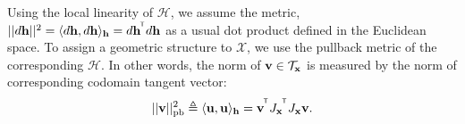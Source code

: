 Using the local linearity of $\mathcal{H}$, we assume the metric, $||d\mathbf{h}||^2 = \langle d\mathbf{h}, d\mathbf{h} \rangle_\mathbf{h} = d\mathbf{h}^{^{\mkern-1.5mu\mathsf{T}}} d\mathbf{h}$ as a usual dot product defined in the Euclidean space.
To assign a geometric structure to $\mathcal{X}$, we use the pullback metric of the corresponding $\mathcal{H}$.
In other words, the norm of $\mathbf{v} \in \mathcal{T}_\mathbf{x}{}$ is measured by the norm of corresponding codomain tangent vector:
\begin{equation} \label{eq:pullback}
\begin{aligned}
||\mathbf{v}{}||^2_\text{pb} \triangleq  \langle \mathbf{u}{}, \mathbf{u}{} \rangle_{\mathbf{h}} = \mathbf{v}{}^{^{\mkern-1.5mu\mathsf{T}}} {J}_{\mathbf{x}}{}^{^{\mkern-1.5mu\mathsf{T}}} {J}_{\mathbf{x}}{}\mathbf{v}{}.
\end{aligned}
\end{equation}





